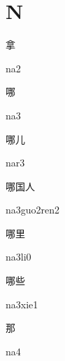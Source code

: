 ﻿%
\section*{N}
\begin{multicols*}{2}

\begin{verbete}[na2]{拿}
\begin{pronuncia}{na2}
\end{pronuncia}
\end{verbete}

\begin{verbete}[na3]{哪}
\begin{pronuncia}{na3}
\end{pronuncia}
\end{verbete}

\begin{verbete}[nar3]{哪儿}
\begin{pronuncia}{nar3}
\end{pronuncia}
\end{verbete}

\begin{verbete}{哪国人}
\begin{pronuncia}{na3guo2ren2}
\end{pronuncia}
\end{verbete}

\begin{verbete}[na3li0]{哪里}
\begin{pronuncia}{na3li0}
\end{pronuncia}
\end{verbete}

\begin{verbete}[na3xie1]{哪些}
\begin{pronuncia}{na3xie1}
\end{pronuncia}
\end{verbete}

\begin{verbete}[na4]{那}
\begin{pronuncia}{na4}
\end{pronuncia}
\end{verbete}


\end{multicols*}
